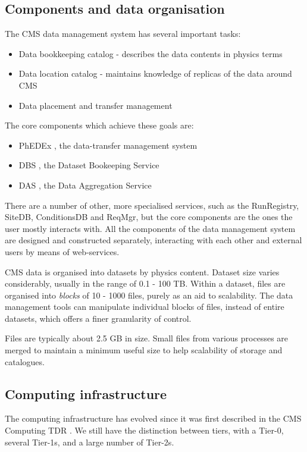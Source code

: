 \subsection{Components and data organisation}
The CMS data management system has several important tasks:
\begin{itemize}
  \item Data bookkeeping catalog - describes the data contents in physics terms
  \item Data location catalog - maintains knowledge of replicas of the data around CMS
  \item Data placement and transfer management
\end{itemize}

The core components which achieve these goals are:
\begin{itemize}
  \item PhEDEx \cite{PhEDEx}, the data-transfer management system
  \item DBS \cite{DBS}, the Dataset Bookeeping Service
  \item DAS \cite{DAS}, the Data Aggregation Service
\end{itemize}

There are a number of other, more specialised services, such as the RunRegistry, SiteDB, 
ConditionsDB and ReqMgr, but the core components are the ones the user mostly interacts with. All 
the components of the data management system are designed and constructed separately, interacting 
with each other and external users by means of web-services.

CMS data is organised into datasets by physics content. Dataset size varies considerably, usually 
in the range of 0.1 - 100 TB. Within a dataset, files are organised into {\it blocks} of 10 - 1000 
files, purely as an aid to scalability. The data management tools can manipulate individual blocks 
of files, instead of entire datasets, which offers a finer granularity of control.

Files are typically about 2.5 GB in size. Small files from various processes are merged to 
maintain a minimum useful size to help scalability of storage and catalogues.

\subsection{Computing infrastructure}
The computing infrastructure has evolved since it was first described in the CMS Computing TDR 
\cite{CTDR}. We still have the distinction between tiers, with a Tier-0, several Tier-1s, and a 
large number of Tier-2s.

